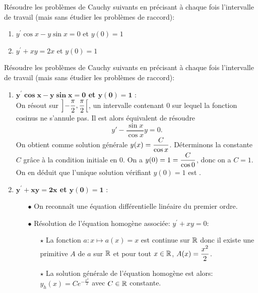 \documentclass[a4paper, 11pt,reqno]{article}
\begin{document}
\begin{exercice}   \; 
R\'esoudre les probl\`emes de Cauchy suivants en pr\'ecisant \`a chaque fois l'intervalle de travail (mais sans \'etudier les probl\`emes de raccord):
\begin{enumerate}
 \item $y^{\prime}\cos{x}-y\sin{x}=0$ et $y(0)=1$
\item $y^{\prime}+xy=2x$ et $y(0)=1$
\end{enumerate}
\end{exercice}
\begin{correction}   \;
R\'esoudre les probl\`emes de Cauchy suivants en pr\'ecisant \`a chaque fois l'intervalle de travail (mais sans \'etudier les probl\`emes de raccord):
\begin{enumerate}
 \item \textbf{$\mathbf{y^{\prime}\cos{x}-y\sin{x}=0}$ et $\mathbf{y(0)=1}$} :\\
 On r\'esout sur $\displaystyle \left]-\frac{\pi}{2}, \frac{\pi}{2}\right[$, un intervalle contenant $0$ sur lequel la fonction cosinus ne s'annule pas. Il est alors \'equivalent de r\'esoudre 
 $$y' - \frac{\sin x}{\cos x} y = 0.$$
 On obtient comme solution g\'en\'erale $y(x) =\displaystyle \frac{C}{\cos x}$. D\'eterminons la constante $C$ gr\^ace \`a la condition initiale en $0$. On a $y(0)=1=\displaystyle \frac{C}{\cos 0}$, donc on a $C=1$. On en d\'eduit que l'unique solution v\'erifiant $y(0)=1$ est \fbox{$y : x\ddp \in \ddp \left]-\frac{\pi}{2}, \frac{\pi}{2}\right[ \; \mapsto \frac{1}{\cos x}$}.
\item \textbf{$\mathbf{y^{\prime}+xy=2x}$ et $\mathbf{y(0)=1}$} :\\
\begin{itemize}
\item[$\bullet$] On reconna\^{i}t une \'equation diff\'erentielle lin\'eaire du premier ordre.\\
\item[$\bullet$] R\'esolution de l'\'equation homog\`{e}ne associ\'ee: $y^{\prime}+xy=0$:
\begin{itemize}
\item[$\star$] La fonction $a: x\mapsto a(x)=x$ est continue sur $\mathbb{R}$ donc il existe une primitive $A$ de $a$ sur $\mathbb{R}$ et pour tout $x\in\mathbb{R}$, $A(x)=\displaystyle\frac{x^2}{2}$. 
\item[$\star$] La solution g\'en\'erale de l'\'equation homog\`{e}ne est alors: $y_h(x)= Ce^{-\frac{x^2}{2}}$ avec $C\in\mathbb{R}$ constante.

\end{itemize}
\end{itemize}
\end{enumerate}
\end{correction}
\end{document}
